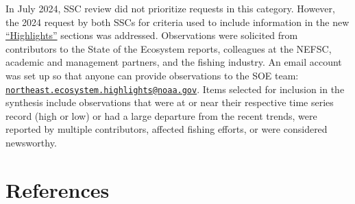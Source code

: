 \documentclass[
  10pt,
]{article}
\begin{document}
In July 2024, SSC review did not prioritize requests in this category.
However, the 2024 request by both SSCs for criteria used to include
information in the new
\href{https://noaa-edab.github.io/catalog/observation_synthesis_2024.html}{``Highlights''}
sections was addressed. Observations were solicited from contributors to
the State of the Ecosystem reports, colleagues at the NEFSC, academic
and management partners, and the fishing industry. An email account was
set up so that anyone can provide observations to the SOE team:
\href{mailto:northeast.ecosystem.highlights@noaa.gov}{\nolinkurl{northeast.ecosystem.highlights@noaa.gov}}.
Items selected for inclusion in the synthesis include observations that
were at or near their respective time series record (high or low) or had
a large departure from the recent trends, were reported by multiple
contributors, affected fishing efforts, or were considered newsworthy.

\newpage

\section*{References}\label{references}
\end{document}
